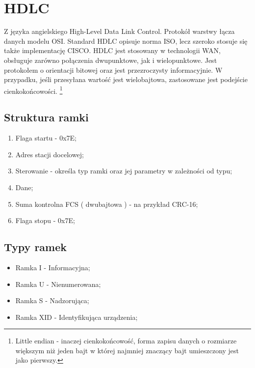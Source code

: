 \section{HDLC}
Z języka angielskiego High-Level Data Link Control. Protokół warstwy łącza danych modelu OSI. 
Standard HDLC opisuje norma ISO, lecz szeroko stosuje się także implementację CISCO.
HDLC jest stosowany w technologii WAN, obsługuje zarówno połączenia dwupunktowe, jak i wielopunktowe. 
Jest protokołem o orientacji bitowej oraz jest przezroczysty informacyjnie. \autocite{WIKI_HDLC}
W przypadku, jeśli przesyłana wartość jest wielobajtowa, zastosowane jest podejście cienkokońcowości.
\footnote{\label{Little endian} Little endian - inaczej cienkokońcowość, forma zapisu danych o rozmiarze większym niż jeden bajt w której najmniej znaczący bajt umieszczony jest jako pierwszy.}
\subsection{Struktura ramki}
\begin{enumerate}
    \item Flaga startu - 0x7E;
    \item Adres stacji docelowej;
    \item Sterowanie - określa typ ramki oraz jej parametry w zależności od typu;
    \item Dane;
    \item Suma kontrolna FCS ( dwubajtowa ) - na przykład CRC-16;
    \item Flaga stopu - 0x7E;
\end{enumerate}
\subsection{Typy ramek}
\begin{itemize}
    \item Ramka I - Informacyjna;
    \item Ramka U - Nienumerowana;
    \item Ramka S - Nadzorująca;
    \item Ramka XID - Identyfikująca urządzenia;
\end{itemize}

